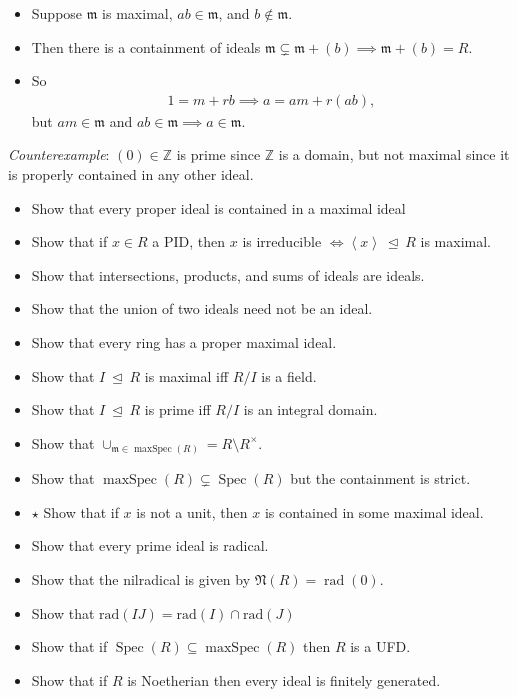 \begin{solution}

\begin{itemize}
\item
  Suppose \({\mathfrak{m}}\) is maximal, \(ab\in {\mathfrak{m}}\), and
  \(b\not\in {\mathfrak{m}}\).
\item
  Then there is a containment of ideals
  \({\mathfrak{m}}\subsetneq {\mathfrak{m}}+ (b) \implies {\mathfrak{m}}+ (b) = R\).
\item
  So
  \begin{align*}
  1 = m + rb \implies a = am + r(ab)
  ,\end{align*}
  but \(am\in {\mathfrak{m}}\) and
  \(ab\in {\mathfrak{m}}\implies a\in {\mathfrak{m}}\).
\end{itemize}

\emph{Counterexample}: \((0) \in {\mathbb{Z}}\) is prime since
\({\mathbb{Z}}\) is a domain, but not maximal since it is properly
contained in any other ideal.

\end{solution}

\begin{itemize}
\tightlist
\item
  Show that every proper ideal is contained in a maximal ideal
\item
  Show that if \(x\in R\) a PID, then \(x\) is irreducible
  \(\iff \left\langle{x}\right\rangle{~\trianglelefteq~}R\) is maximal.
\item
  Show that intersections, products, and sums of ideals are ideals.
\item
  Show that the union of two ideals need not be an ideal.
\item
  Show that every ring has a proper maximal ideal.
\item
  Show that \(I{~\trianglelefteq~}R\) is maximal iff \(R/I\) is a field.
\item
  Show that \(I {~\trianglelefteq~}R\) is prime iff \(R/I\) is an
  integral domain.
\item
  Show that
  \(\cup_{{\mathfrak{m}}\in {\operatorname{maxSpec}}(R)} = R\setminus R^{\times}\).
\item
  Show that
  \({\operatorname{maxSpec}}(R) \subsetneq \operatorname{Spec}(R)\) but
  the containment is strict.
\item
  \(\star\) Show that if \(x\) is not a unit, then \(x\) is contained in
  some maximal ideal.
\item
  Show that every prime ideal is radical.
\item
  Show that the nilradical is given by
  \({\mathfrak{N}}(R) = {\operatorname{rad}}(0)\).
\item
  Show that \(\text{rad}(IJ) = \text{rad}(I) \cap\text{rad}(J)\)
\item
  Show that if
  \(\operatorname{Spec}(R) \subseteq {\operatorname{maxSpec}}(R)\) then
  \(R\) is a UFD.
\item
  Show that if \(R\) is Noetherian then every ideal is finitely
  generated.
\end{itemize}

